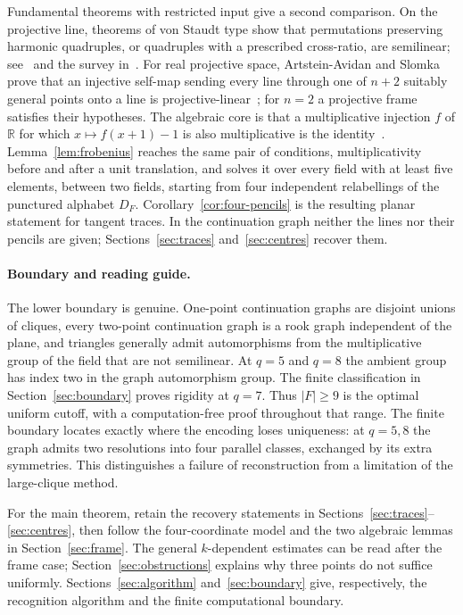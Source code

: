 \documentclass[11pt]{article}
\theoremstyle{definition}
\theoremstyle{remark}
\begin{document}
Fundamental theorems with restricted input give a second comparison. On
the projective line, theorems of von Staudt type show that permutations
preserving harmonic quadruples, or quadruples with a prescribed
cross-ratio, are semilinear; see~\cite[Section~1]{HalKap} and the survey
in~\cite[Section~1]{Havlicek}. For real projective space,
Artstein-Avidan and Slomka prove that an injective self-map sending every
line through one of $n+2$ suitably general points onto a line is
projective-linear~\cite[Theorem~1.7]{AAS}; for $n=2$ a projective frame
satisfies their hypotheses. The algebraic core is that a multiplicative
injection $f$ of $\mathbb{R}$ for which $x\mapsto f(x+1)-1$ is also
multiplicative is the identity~\cite[Lemma~3.6]{AAS}.
Lemma~\ref{lem:frobenius} reaches the same pair of conditions,
multiplicativity before and after a unit translation, and solves it over
every field with at least five elements, between two fields, starting from
four independent relabellings of the punctured alphabet $D_F$.
Corollary~\ref{cor:four-pencils} is the resulting planar statement for
tangent traces. In the continuation graph neither the lines nor their
pencils are given; Sections~\ref{sec:traces} and~\ref{sec:centres}
recover them.

\paragraph{Boundary and reading guide.}
The lower boundary is genuine.  One-point continuation graphs are disjoint
unions of cliques, every two-point continuation graph is a rook graph
independent of the plane, and triangles generally admit automorphisms from
the multiplicative group of the field that are not semilinear.  At $q=5$ and $q=8$ the ambient group has index two in the graph
automorphism group. The finite classification in
Section~\ref{sec:boundary} proves rigidity at $q=7$.
Thus $|F|\ge9$ is the optimal uniform cutoff, with a computation-free
proof throughout that range. The finite
boundary locates exactly where the encoding loses uniqueness: at $q=5,8$
the graph admits two resolutions into four parallel classes, exchanged by its extra
symmetries. This distinguishes a failure of reconstruction from a
limitation of the large-clique method.

For the main theorem, retain the recovery statements in
Sections~\ref{sec:traces}--\ref{sec:centres}, then follow the four-coordinate
model and the two algebraic lemmas in Section~\ref{sec:frame}.
The general $k$-dependent estimates can be read after the frame case;
Section~\ref{sec:obstructions} explains why three points do not suffice
uniformly.
Sections~\ref{sec:algorithm} and~\ref{sec:boundary} give, respectively,
the recognition algorithm and the finite computational boundary.
\end{document}
